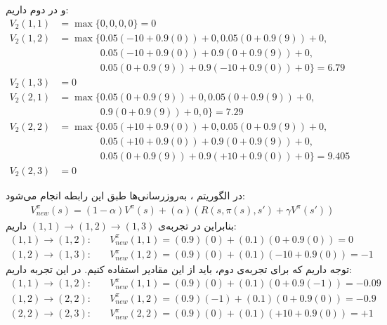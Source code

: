 \begin{ابجد}
و در  دوم داریم:
\begin{align*}
    V_{2}(1, 1) & = \max \{ 0, 0, 0, 0 \} = 0                                                & \\[1em]
    V_{2}(1, 2) & = \max \{ 0.05(-10 + 0.9(0)) + 0, 0.05(0 + 0.9(9)) + 0,                    & \\
                & \phantom{{}= \max \{ } 0.05(-10 + 0.9(0)) + 0.9(0 + 0.9(9)) + 0,           & \\
                & \phantom{{}= \max \{ } 0.05(0 + 0.9(9)) + 0.9(-10 + 0.9(0)) + 0 \} = 6.79  & \\[1em]
    V_{2}(1, 3) & = 0                                                                        & \\[1em]
    V_{2}(2, 1) & = \max \{ 0.05(0 + 0.9(9)) + 0, 0.05(0 + 0.9(9)) + 0,                      & \\
                & \phantom{{}= \max \{ } 0.9(0 + 0.9(9)) + 0, 0 \} = 7.29                    & \\[1em]
    V_{2}(2, 2) & = \max \{ 0.05(+10 + 0.9(0)) + 0, 0.05(0 + 0.9(9)) + 0,                    & \\
                & \phantom{{}= \max \{ } 0.05(+10 + 0.9(0)) + 0.9(0 + 0.9(9)) + 0,           & \\
                & \phantom{{}= \max \{ } 0.05(0 + 0.9(9)) + 0.9(+10 + 0.9(0)) + 0 \} = 9.405 & \\[1em]
    V_{2}(2, 3) & = 0                                                                        &
\end{align*}


\item در الگوریتم ، به‌روزرسانی‌ها طبق این رابطه انجام می‌شود:
\begin{align*}
    V_{new}^{\pi}(s) = (1 - \alpha)V^{\pi}(s) + (\alpha)(R(s, \pi(s), s') + \gamma V^{\pi}(s'))
\end{align*}
بنابراین در تجربه‌ی $(1,1) \rightarrow (1,2) \rightarrow (1,3)$ داریم:
\begin{align*}
    (1,1) \rightarrow (1,2): & \quad V_{new}^{\pi}(1,1) = (0.9)(0) + (0.1)(0 + 0.9(0)) = 0    \\
    (1,2) \rightarrow (1,3): & \quad V_{new}^{\pi}(1,2) = (0.9)(0) + (0.1)(-10 + 0.9(0)) = -1
\end{align*}
توجه داریم که برای تجربه‌ی دوم، باید از این مقادیر استفاده کنیم. در این تجربه داریم:
\begin{align*}
    (1,1) \rightarrow (1,2): & \quad V_{new}^{\pi}(1,1) = (0.9)(0) + (0.1)(0 + 0.9(-1)) = -0.09 \\
    (1,2) \rightarrow (2,2): & \quad V_{new}^{\pi}(1,2) = (0.9)(-1) + (0.1)(0 + 0.9(0)) = -0.9  \\
    (2,2) \rightarrow (2,3): & \quad V_{new}^{\pi}(2,2) = (0.9)(0) + (0.1)(+10 + 0.9(0)) = +1
\end{align*}


\end{ابجد}
